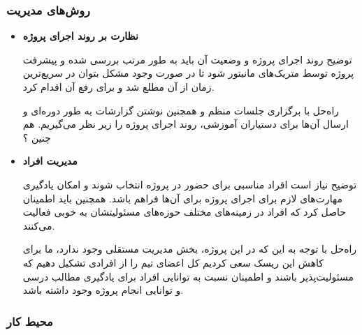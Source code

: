 \subsubsection{روش‌های مدیریت}


\begin{itemize}
	
	\item 
	\textbf{نظارت بر روند اجرای پروژه‌}

	توضیح \hspace*{1cm} 
	روند اجرای پروژه و وضعیت آن باید به طور مرتب بررسی شده و پیشرفت پروژه توسط متریک‌های مانیتور شود تا در صورت وجود مشکل بتوان در سریع‌ترین زمان از آن مطلع شد و برای رفع آن اقدام کرد.
	
	راه‌حل \hspace*{1cm} 
	با برگزاری جلسات منظم و همچنین نوشتن گزارشات به طور دوره‌ای و ارسال آن‌ها برای دستیاران آموزشی، روند اجرای پروژه را زیر نظر می‌گیریم.
هم چنین ؟
	
\item 
\textbf{مدیریت افراد‌}

توضیح \hspace*{1cm} 
نیاز است افراد مناسبی برای حضور در پروژه انتخاب شوند و امکان یادگیری مهارت‌های لازم برای اجرای پروژه برای آن‌ها فراهم باشد. همچنین باید اطمینان حاصل کرد که افراد در زمینه‌های مختلف حوزه‌های مسئولیتشان به خوبی فعالیت می‌کنند.

راه‌حل \hspace*{1cm} 
با توجه به این که در این پروژه، بخش مدیریت مستقلی وجود ندارد، ما برای کاهش این ریسک سعی کردیم کل اعضای تیم را از افرادی تشکیل دهیم که مسئولیت‌پذیر باشند و اطمینان نسبت به توانایی‌ افراد برای یادگیری مطالب درسی و توانایی انجام پروژه وجود داشته باشد.


\end{itemize}

\subsubsection{محیط کار}


